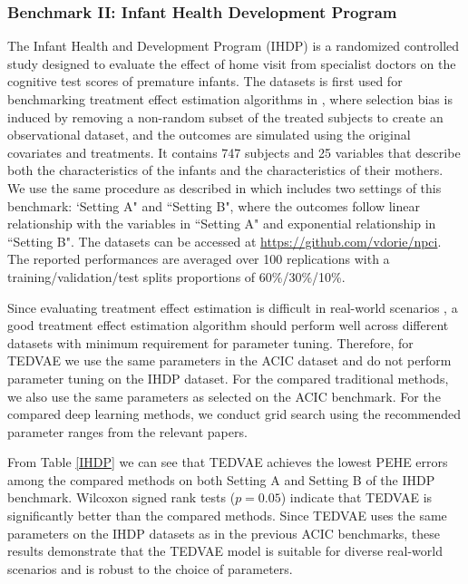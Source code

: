 \documentclass[letterpaper]{article} %
\begin{document}
\subsubsection{Benchmark II: Infant Health Development Program}
The Infant Health and Development Program (IHDP) is a randomized controlled study designed to evaluate the effect of home visit from specialist doctors on the cognitive test scores of premature infants. 
The datasets is first used for benchmarking treatment effect estimation algorithms in \cite{Hill2011}, where selection bias is induced by removing a non-random subset of the treated subjects to create an observational dataset, and the outcomes are simulated using the original covariates and treatments. 
It contains 747 subjects and 25 variables that describe both the characteristics of the infants and the characteristics of their mothers. 
We use the same procedure as described in \cite{Hill2011} which includes two settings of this benchmark: `Setting A" and ``Setting B", where the outcomes follow linear relationship with the variables in ``Setting A" and exponential relationship in ``Setting B". The datasets can be accessed at \url{https://github.com/vdorie/npci}.
The reported performances are averaged over 100 replications with a training/validation/test splits proportions of 60\%/30\%/10\%.

Since evaluating treatment effect estimation is difficult in real-world scenarios \cite{Alaa2019}, a good treatment effect estimation algorithm should perform well across different datasets with minimum requirement for parameter tuning.
Therefore, for TEDVAE we use the same parameters in the ACIC dataset and do not perform parameter tuning on the IHDP dataset. 
For the compared traditional methods, we also use the same parameters as selected on the ACIC benchmark. For the compared deep learning methods, we conduct grid search using the recommended parameter ranges from the relevant papers.

From Table \ref{IHDP} we can see that TEDVAE achieves the lowest PEHE errors among the compared methods on both Setting A and Setting B of the IHDP benchmark. Wilcoxon signed rank tests ($p=0.05$) indicate that TEDVAE is significantly better than the compared methods.
Since TEDVAE uses the same parameters on the IHDP datasets as in the previous ACIC benchmarks,  these results demonstrate that the TEDVAE model is suitable for diverse real-world scenarios and is robust to the choice of parameters.
\end{document}
